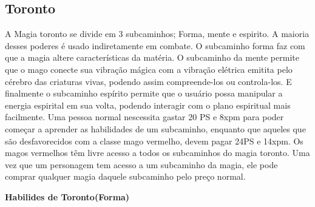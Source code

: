\subsection{Toronto}

A Magia toronto se divide em 3 subcaminhos; Forma, mente e espirito. A maioria desses poderes é usado indiretamente em combate. O subcaminho forma faz com que a magia altere características da matéria. O subcaminho da mente permite que o mago conecte sua vibração mágica com a vibração elétrica emitita pelo cérebro das criaturas vivas, podendo assim compreende-los ou controla-los. E finalmente o subcaminho espírito permite que o usuário possa manipular a energia espirital em sua volta, podendo interagir com o plano espiritual mais facilmente. Uma pessoa normal nescessita gastar 20 PS e 8xpm para poder começar a aprender as habilidades de um subcaminho, enquanto que aqueles que são desfavorecidos com a classe mago vermelho, devem pagar 24PS e 14xpm. Os magos vermelhos têm livre acesso a todos os subcaminhos do magia toronto. Uma vez que um personagem tem acesso a um subcaminho da magia, ele pode comprar qualquer magia daquele subcaminho pelo preço normal.

\textbf{Habilides de Toronto(Forma)}

